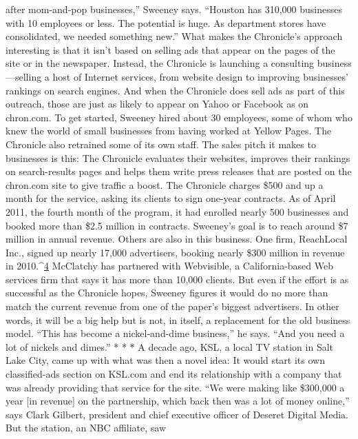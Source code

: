 after mom-and-pop businesses,'' Sweeney says. ``Houston has 310,000 businesses
with 10 employees or less. The potential is huge. As department stores have consolidated,
we needed something new.''
What makes the Chronicle’s approach interesting is that it isn’t based on selling
ads that appear on the pages of the site or in the newspaper. Instead, the
Chronicle is launching a consulting business—selling a host of Internet services,
from website design to improving businesses’ rankings on search engines. And
when the Chronicle does sell ads as part of this outreach, those are just as likely
to appear on Yahoo or Facebook as on chron.com.
To get started, Sweeney hired about 30 employees, some of whom who knew
the world of small businesses from having worked at Yellow Pages. The Chronicle
also retrained some of its own staff. The sales pitch it makes to businesses is this:
The Chronicle evaluates their websites, improves their rankings on search-results
pages and helps them write press releases that are posted on the chron.com site
to give traffic a boost.
The Chronicle charges \$500 and up a month for the service, asking its clients
to sign one-year contracts. As of April 2011, the fourth month of the program, it
had enrolled nearly 500 businesses and booked more than \$2.5 million in contracts.
Sweeney’s goal is to reach around \$7 million in annual revenue.
Others are also in this business. One firm, ReachLocal Inc., signed up nearly
17,000 advertisers, booking nearly \$300 million in revenue in 2010.^{\href{#endnotes-ch8}{4}} McClatchy
has partnered with Webvisible, a California-based Web services firm that says it
has more than 10,000 clients.
But even if the effort is as successful as the Chronicle hopes, Sweeney figures it
would do no more than match the current revenue from one of the paper’s biggest
advertisers. In other words, it will be a big help but is not, in itself, a replacement
for the old business model. ``This has become a nickel-and-dime business,''
he says. ``And you need a lot of nickels and dimes.''
* * *
A decade ago, KSL, a local TV station in Salt Lake City, came up with what
was then a novel idea: It would start its own classified-ads section on KSL.com
and end its relationship with a company that was already providing that service
for the site.
``We were making like \$300,000 a year [in revenue] on the partnership, which
back then was a lot of money online,'' says Clark Gilbert, president and chief
executive officer of Deseret Digital Media. But the station, an NBC affiliate, saw
